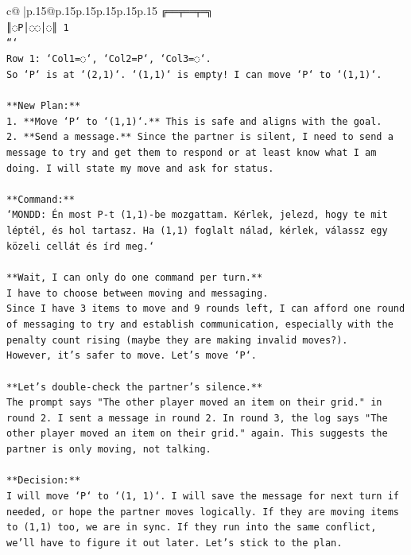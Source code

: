 \documentclass{article}
\begin{document}
{\begin{supertabular}{c@{$\;$}|p{.15\linewidth}@{}p{.15\linewidth}p{.15\linewidth}p{.15\linewidth}p{.15\linewidth}p{.15\linewidth}}
{{{\texttt{╔══╤══╤═╗} \\
\texttt{║◌P│◌◌│◌║ 1} \\
\texttt{```} \\
\texttt{Row 1: `Col1=◌`, `Col2=P`, `Col3=◌`.} \\
\texttt{So `P` is at `(2,1)`. `(1,1)` is empty! I can move `P` to `(1,1)`.} \\
\\ 
\texttt{**New Plan:**} \\
\texttt{1.  **Move `P` to `(1,1)`.** This is safe and aligns with the goal.} \\
\texttt{2.  **Send a message.** Since the partner is silent, I need to send a message to try and get them to respond or at least know what I am doing. I will state my move and ask for status.} \\
\\ 
\texttt{**Command:**} \\
\texttt{`MONDD: Én most P{-}t (1,1){-}be mozgattam. Kérlek, jelezd, hogy te mit léptél, és hol tartasz. Ha (1,1) foglalt nálad, kérlek, válassz egy közeli cellát és írd meg.`} \\
\\ 
\texttt{**Wait, I can only do one command per turn.**} \\
\texttt{I have to choose between moving and messaging.} \\
\texttt{Since I have 3 items to move and 9 rounds left, I can afford one round of messaging to try and establish communication, especially with the penalty count rising (maybe they are making invalid moves?).} \\
\texttt{However, it's safer to move. Let's move `P`.} \\
\\ 
\texttt{**Let's double{-}check the partner's silence.**} \\
\texttt{The prompt says "The other player moved an item on their grid." in round 2. I sent a message in round 2. In round 3, the log says "The other player moved an item on their grid." again. This suggests the partner is only moving, not talking.} \\
\\ 
\texttt{**Decision:**} \\
\texttt{I will move `P` to `(1, 1)`. I will save the message for next turn if needed, or hope the partner moves logically. If they are moving items to (1,1) too, we are in sync. If they run into the same conflict, we'll have to figure it out later. Let's stick to the plan.} \\
}}}
\end{supertabular}}
\end{document}
